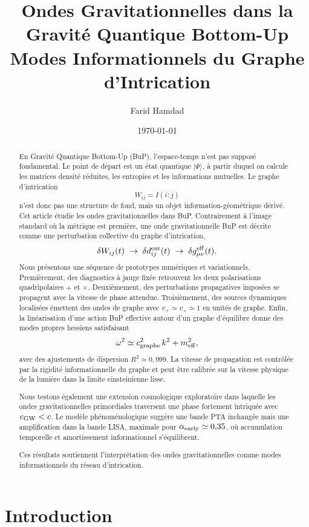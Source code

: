 \documentclass[11pt,a4paper]{article}
\title{
\textbf{Ondes Gravitationnelles dans la Gravité Quantique Bottom-Up}\\
\large Modes Informationnels du Graphe d'Intrication
}
\author{Farid Hamdad}
\date{\today}
\begin{document}
\maketitle

\begin{abstract}
En Gravité Quantique Bottom-Up (BuP), l'espace-temps n'est pas supposé fondamental.
Le point de départ est un état quantique \(|\Psi\rangle\), à partir duquel on calcule
les matrices densité réduites, les entropies et les informations mutuelles. Le
graphe d'intrication
\[
W_{ij} = I(i:j)
\]
n'est donc pas une structure de fond, mais un objet information-géométrique dérivé.
Cet article étudie les ondes gravitationnelles dans BuP. Contrairement à l'image
standard où la métrique est première, une onde gravitationnelle BuP est décrite
comme une perturbation collective du graphe d'intrication,
\[
\delta W_{ij}(t)
\;\rightarrow\;
\delta d_{ij}^{\rm ent}(t)
\;\rightarrow\;
\delta g_{\mu\nu}^{\rm eff}(t).
\]
Nous présentons une séquence de prototypes numériques et variationnels.
Premièrement, des diagnostics à jauge fixée retrouvent les deux polarisations
quadripolaires \(+\) et \(\times\). Deuxièmement, des perturbations propagatives
imposées se propagent avec la vitesse de phase attendue. Troisièmement, des
sources dynamiques localisées émettent des ondes de graphe avec
\(v_+ \simeq v_\times \simeq 1\) en unités de graphe. Enfin, la linéarisation d'une
action BuP effective autour d'un graphe d'équilibre donne des modes propres hessiens
satisfaisant
\[
\omega^2 \simeq c_{\rm graphe}^2 \, k^2 + m_{\rm eff}^2,
\]
avec des ajustements de dispersion \(R^2 \simeq 0{,}999\). La vitesse de propagation
est contrôlée par la rigidité informationnelle du graphe et peut être calibrée
sur la vitesse physique de la lumière dans la limite einsteinienne lisse.

Nous testons également une extension cosmologique exploratoire dans laquelle
les ondes gravitationnelles primordiales traversent une phase fortement
intriquée avec \(c_{\rm GW} < c\). Le modèle phénoménologique suggère une bande PTA
inchangée mais une amplification dans la bande LISA, maximale pour
\(\alpha_{\rm early} \simeq 0{,}35\), où accumulation temporelle et amortissement
informationnel s'équilibrent.

Ces résultats soutiennent l'interprétation des ondes gravitationnelles comme
modes informationnels du réseau d'intrication.
\end{abstract}

\section{Introduction}
\end{document}
